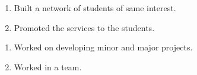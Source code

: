 \documentclass[]{deedy-resume-openfont}
\begin{document}
\begin{minipage}[t]{0.55\textwidth}




\begin{enumerate}
\item Built a network of students of same interest.
\item Promoted the services to the students.
\end{enumerate}
\sectionsep


\runsubsection{}

\begin{enumerate}
\item Worked on developing minor and major projects.
\item Worked in a team.
\end{enumerate}


\end{minipage}
\end{document}

